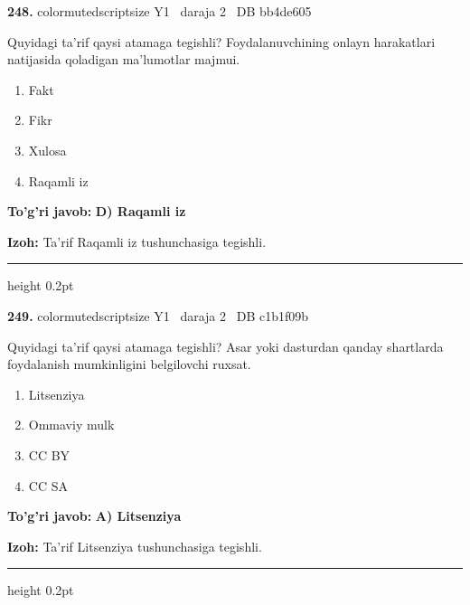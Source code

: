 \documentclass[10pt,a4paper,oneside]{article}
\begin{document}
\noindent\textbf{\color{ink}248.}  {color{muted}scriptsize Y1 \textbullet\ daraja 2 \textbullet\ DB bb4de605}
\par
Quyidagi ta'rif qaysi atamaga tegishli? Foydalanuvchining onlayn harakatlari natijasida qoladigan ma'lumotlar majmui.
\begin{enumerate}[label=\Alph*),leftmargin=9mm]
\item Fakt
\item Fikr
\item Xulosa
\item Raqamli iz
\end{enumerate}
\begin{tcolorbox}[enhanced,breakable,colback=teal!4,colframe=teal!50!black,boxrule=0.5pt,arc=1.1mm,left=3mm,right=3mm,top=1.7mm,bottom=1.7mm,before skip=2mm,after skip=2mm]
\textbf{\color{teal}To'g'ri javob:} \textbf{D) Raqamli iz}
\par\smallskip
\textbf{Izoh:} Ta'rif Raqamli iz tushunchasiga tegishli.
\end{tcolorbox}
\vspace{2mm}\hrule height 0.2pt \vspace{3mm}

\noindent\textbf{\color{ink}249.}  {color{muted}scriptsize Y1 \textbullet\ daraja 2 \textbullet\ DB c1b1f09b}
\par
Quyidagi ta'rif qaysi atamaga tegishli? Asar yoki dasturdan qanday shartlarda foydalanish mumkinligini belgilovchi ruxsat.
\begin{enumerate}[label=\Alph*),leftmargin=9mm]
\item Litsenziya
\item Ommaviy mulk
\item CC BY
\item CC SA
\end{enumerate}
\begin{tcolorbox}[enhanced,breakable,colback=teal!4,colframe=teal!50!black,boxrule=0.5pt,arc=1.1mm,left=3mm,right=3mm,top=1.7mm,bottom=1.7mm,before skip=2mm,after skip=2mm]
\textbf{\color{teal}To'g'ri javob:} \textbf{A) Litsenziya}
\par\smallskip
\textbf{Izoh:} Ta'rif Litsenziya tushunchasiga tegishli.
\end{tcolorbox}
\vspace{2mm}\hrule height 0.2pt \vspace{3mm}
\end{document}
